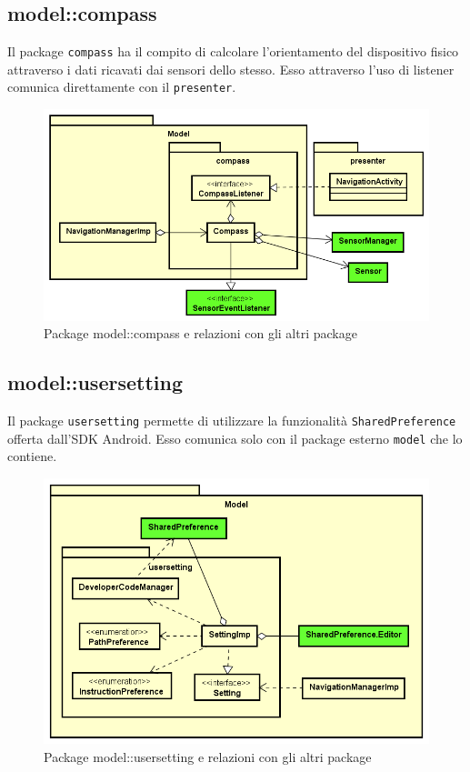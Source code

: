 \documentclass[../DefinizioneDiProdotto.tex,lanscape]{subfiles}
\begin{document}
\newpage

	\subsection{model::compass}
		Il package \verb|compass| ha il compito di calcolare l'orientamento del dispositivo fisico attraverso i dati ricavati dai sensori dello stesso. Esso attraverso l'uso di listener comunica direttamente con il \verb|presenter|.

\begin{figure}[h]
	\centering
	\includegraphics[scale=0.6]{img/RelationPackage/compass}
	\caption{Package model::compass e relazioni con gli altri package}
	\label{compassPackage}
\end{figure}


\newpage

	\subsection{model::usersetting}
		Il package \verb|usersetting| permette di utilizzare la funzionalità \verb|SharedPreference| offerta dall'SDK Android. Esso comunica solo con il package esterno \verb|model| che lo contiene.

\begin{figure}[h]
	\centering
	\includegraphics[scale=0.6]{img/RelationPackage/usersetting}
	\caption{Package model::usersetting e relazioni con gli altri package}
	\label{usersettingPackage}
\end{figure}
\end{document}
